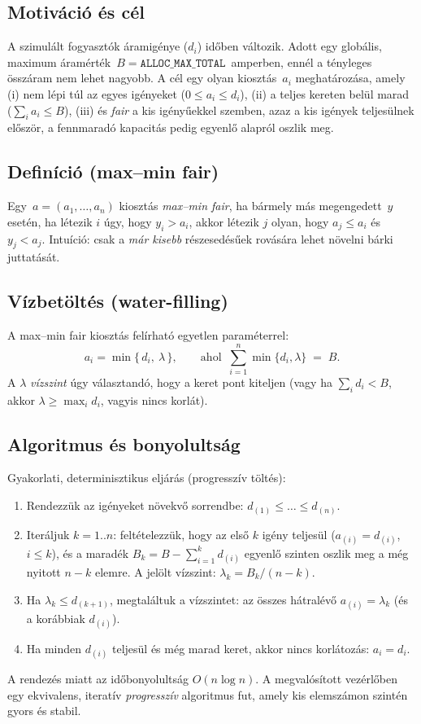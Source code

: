 \subsection{Motiváció és cél}
A szimulált fogyasztók áramigénye (\(d_i\)) időben változik. 
Adott egy globális, maximum áramérték \(\,B=\texttt{ALLOC\_MAX\_TOTAL}\,\) amperben, 
ennél a tényleges összáram nem lehet nagyobb. A cél egy olyan kiosztás \(\,a_i\) meghatározása, amely
(i) nem lépi túl az egyes igényeket (\(0\le a_i\le d_i\)),
(ii) a teljes kereten belül marad (\(\sum_i a_i \le B\)),
(iii) és \emph{fair} a kis igényűekkel szemben, azaz a kis igények teljesülnek először, a 
fennmaradó kapacitás pedig egyenlő alapról oszlik meg.

\subsection{Definíció (max--min fair)}
Egy \(\,a=(a_1,\dots,a_n)\) kiosztás \emph{max--min fair}, ha bármely más megengedett \(\,y\) esetén, 
ha létezik \(i\) úgy, hogy \(y_i > a_i\), akkor létezik \(j\) olyan, hogy \(a_j \le a_i\) és \(y_j < a_j\). 
Intuíció: csak a \emph{már kisebb} részesedésűek rovására lehet növelni bárki juttatását.

\subsection{Vízbetöltés (water-filling)}
A max--min fair kiosztás felírható egyetlen paraméterrel:
\begin{equation}
  a_i = \min\{\,d_i,\ \lambda\,\}, \qquad \text{ahol }\ \sum_{i=1}^n \min\{d_i,\lambda\} \;=\; B.
\end{equation}
A \(\lambda\) \emph{vízszint} úgy választandó, hogy a keret pont kiteljen (vagy ha \( \sum_i d_i < B\), 
akkor \(\lambda\ge \max_i d_i\), vagyis nincs korlát).

\subsection{Algoritmus és bonyolultság}
Gyakorlati, determinisztikus eljárás (progresszív töltés):
\begin{enumerate}
  \item Rendezzük az igényeket növekvő sorrendbe: \(d_{(1)} \le \dots \le d_{(n)}\).
  \item Iteráljuk \(k=1..n\): feltételezzük, hogy az első \(k\) igény teljesül (\(a_{(i)}=d_{(i)}\), \(i\le k\)), 
  és a maradék \(B_k = B - \sum_{i=1}^k d_{(i)}\) egyenlő szinten oszlik meg a még nyitott \(n-k\) elemre. 
  A jelölt vízszint: \(\lambda_k = B_k/(n-k)\).
  \item Ha \(\lambda_k \le d_{(k+1)}\), megtaláltuk a vízszintet: az összes hátralévő \(a_{(i)}=\lambda_k\) 
  (és a korábbiak \(d_{(i)}\)).
  \item Ha minden \(d_{(i)}\) teljesül és még marad keret, akkor nincs korlátozás: \(a_i=d_i\).
\end{enumerate}
A rendezés miatt az időbonyolultság \(O(n\log n)\). A megvalósított vezérlőben egy ekvivalens, 
iteratív \emph{progresszív} algoritmus fut, amely kis elemszámon szintén gyors és stabil.

